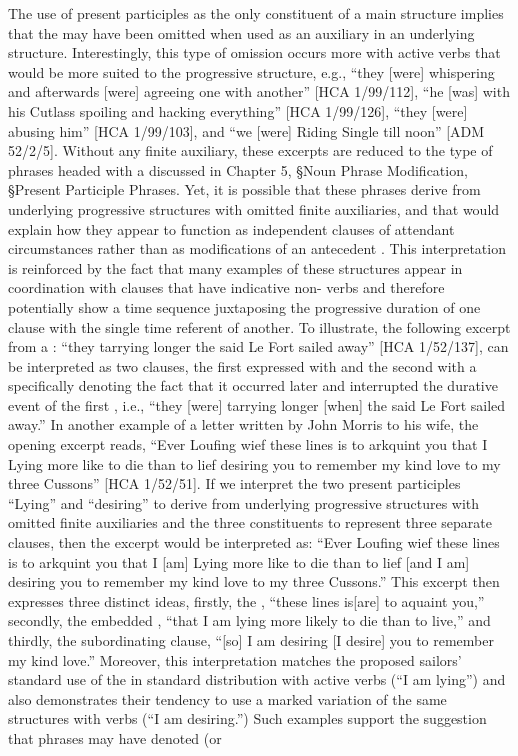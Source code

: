 The use of present participles as the only constituent of a main  structure implies that the  may have been omitted when used as an auxiliary in an underlying  structure. Interestingly, this type of omission occurs more with active verbs that would be more suited to the progressive  structure, e.g., “they [were] whispering and afterwards [were] agreeing one with another” [HCA 1/99/112], “he [was] with his Cutlass spoiling and hacking everything” [HCA 1/99/126], “they [were] abusing him” [HCA 1/99/103], and “we [were] Riding Single till noon” [ADM 52/2/5]. Without any finite auxiliary, these excerpts are reduced to the type of phrases headed with a  discussed in Chapter 5, §Noun Phrase Modification, §Present Participle Phrases. Yet, it is possible that these phrases derive from underlying progressive  structures with omitted finite auxiliaries, and that would explain how they appear to function as independent clauses of attendant circumstances rather than as modifications of an antecedent . This interpretation is reinforced by the fact that many examples of these structures appear in coordination with clauses that have indicative non- verbs and therefore potentially show a time sequence juxtaposing the progressive duration of one clause with the single time referent of another. To illustrate, the following excerpt from a : “they tarrying longer the said Le Fort sailed away” [HCA 1/52/137], can be interpreted as two clauses, the first expressed with  and the second with a   specifically denoting the fact that it occurred later and interrupted the durative event of the first , i.e., “they [were] tarrying longer [when] the said Le Fort sailed away.”  In another example of a letter written by  John Morris to his wife, the opening excerpt reads, “Ever Loufing wief these lines is to arkquint you that I Lying more like to die than to lief desiring you to remember my kind love to my three Cussons” [HCA 1/52/51]. If we interpret the two present participles “Lying” and “desiring” to derive from underlying progressive  structures with omitted finite auxiliaries and the three  constituents to represent three separate clauses, then the excerpt would be interpreted as: “Ever Loufing wief these lines is to arkquint you that I [am] Lying more like to die than to lief [and I am] desiring you to remember my kind love to my three Cussons.” This excerpt then expresses three distinct ideas, firstly, the , “these lines is[are] to aquaint you,” secondly, the embedded , “that I am lying more likely to die than to live,” and thirdly, the subordinating clause, “[so] I am desiring [I desire] you to remember my kind love.”  Moreover, this interpretation matches the proposed sailors’ standard use of the  in standard distribution with active verbs (“I am lying”) and also demonstrates their tendency to use a marked variation of the same structures with  verbs (“I am desiring.”) Such examples support the suggestion that  phrases may have denoted (or 